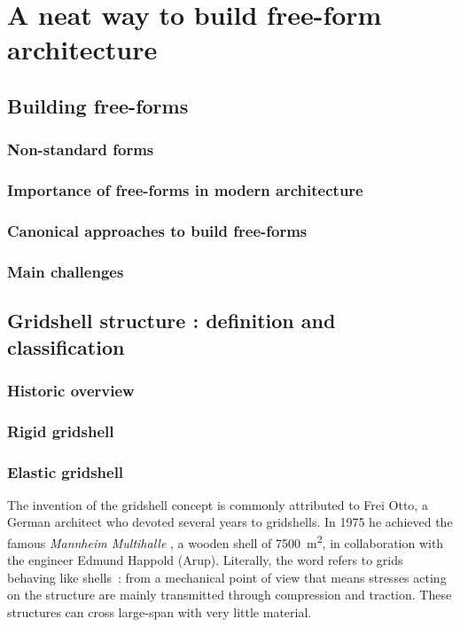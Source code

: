 
\chapter{A neat way to build free-form architecture}

\cite{Barnes1975}
\citeauthor{Barnes1975}
\cite{Bouhaya2009}
\citeauthor{Bouhaya2009}
\cite{ALCIMED2012}

\section{Building free-forms}
\subsection{Non-standard forms}
\subsection{Importance of free-forms in modern architecture}
\subsection{Canonical approaches to build free-forms}
\subsection{Main challenges}

\section{Gridshell structure : definition and classification}
\subsection{Historic overview}
\subsection{Rigid gridshell}
\subsection{Elastic gridshell}

The invention of the gridshell concept is commonly attributed to Frei Otto, a German architect who devoted several years to gridshells. In 1975 he achieved the famous \emph{Mannheim Multihalle} \cite{Happold1975}, a wooden shell of 7500~m\textsuperscript{2}, in collaboration with the engineer Edmund Happold (Arup).
Literally, the word  refers to grids behaving like shells~: from a mechanical point of view that means stresses acting on the structure are mainly transmitted through compression and traction. These structures can cross large-span with very little material.

